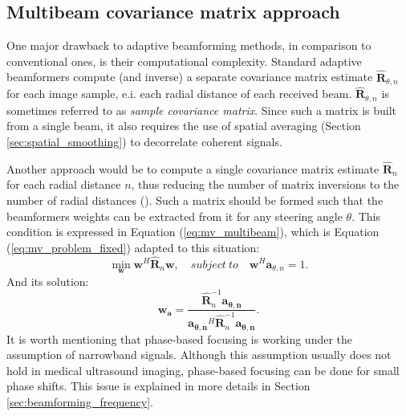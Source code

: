 \subsection{Multibeam covariance matrix approach}
\label{sec:multibeam}
One major drawback to adaptive beamforming methods, in comparison to conventional ones, is their computational complexity. Standard adaptive beamformers compute (and inverse) a separate covariance matrix estimate $\boldsymbol{\hat{R}}_{\theta, n}$ for each image sample, e.i. each radial distance of each received beam. $\boldsymbol{\hat{R}}_{\theta, n}$ is sometimes referred to as \textit{sample covariance matrix}. Since such a matrix is built from a single beam, it also requires the use of spatial averaging (Section \ref{sec:spatial_smoothing}) to decorrelate coherent signals.
\par
Another approach would be to compute a single covariance matrix estimate $\boldsymbol{\hat{R}}_n$ for each radial distance $n$, thus reducing the number of matrix inversions to the number of radial distances (\cite{Jensen_multibeam}). Such a matrix should be formed such that the beamformers weights can be extracted from it for any steering angle $\theta$. This condition is expressed in Equation (\ref{eq:mv_multibeam}), which is Equation (\ref{eq:mv_problem_fixed}) adapted to this situation:
\begin{equation}
    \min_{\boldsymbol{w}} \boldsymbol{w}^H \boldsymbol{\hat{R}}_n \boldsymbol{w}, \quad subject ~ to \quad \boldsymbol{w}^H \boldsymbol{a}_{\theta,n} = 1.
\label{eq:mv_multibeam}
\end{equation}
\noindent
And its solution:
\begin{equation}
    \boldsymbol{w_a} = \frac{\boldsymbol{\hat{R}}_{n}^{-1} \boldsymbol{a_{\theta,n}}}{\boldsymbol{a_{\theta,n}}^H \boldsymbol{\hat{R}}_{n}^{-1} \boldsymbol{a_{\theta,n}}}.
\label{eq:mvmb_weight}
\end{equation}
\noindent
It is worth mentioning that phase-based focusing is working under the assumption of narrowband signals. Although this assumption usually does not hold in medical ultrasound imaging, phase-based focusing can be done for small phase shifts. This issue is explained in more details in Section \ref{sec:beamforming_frequency}.

